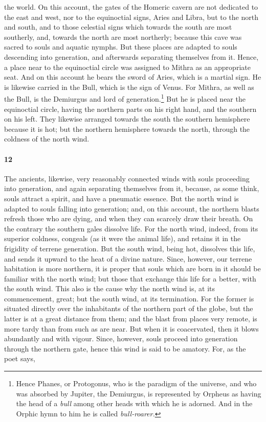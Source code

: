 \documentclass[a4paper,12pt]{article}
\begin{document}
the world. On this account, the gates of the Homeric cavern are not dedicated
to the east and west, nor to the equinoctial signs, Aries and Libra, but to the
north and south, and to those celestial signs which towards the south are most
southerly, and, towards the north are most northerly; because this cave was
sacred to souls and aquatic nymphs. But these places are adapted to souls
descending into generation, and afterwards separating themselves from it.
Hence, a place near to the equinoctial circle was assigned to Mithra as an
appropriate seat. And on this account he bears the sword of Aries, which is a
martial sign. He is likewise carried in the Bull, which is the sign of Venus.
For Mithra, as well as the Bull, is the Demiurgus and lord of
generation.\footnote{Hence Phanes, or Protogonus, who is the paradigm of the
universe, and who was absorbed by Jupiter, the Demiurgus, is represented by
Orpheus as having the head of a \textit{bull} among other heads with which he
is adorned. And in the Orphic hymn to him he is called \textit{bull-roarer.}}
But he is placed near the equinoctial circle, having the northern parts on his
right hand, and the southern on his left. They likewise arranged towards the
south the southern hemisphere because it is hot; but the northern hemisphere
towards the north, through the coldness of the north wind.


\paragraph{12} The ancients, likewise, very reasonably connected winds with
souls proceeding into generation, and again separating themselves from it,
because, as some think, souls attract a spirit, and have a pneumatic essence.
But the north wind is adapted to souls falling into generation; and, on this
account, the northern blasts refresh those who are dying, and when they can
scarcely draw their breath. On the contrary the southern gales dissolve life.
For the north wind, indeed, from its superior coldness, congeals (as it were
the animal life), and retains it in the frigidity of terrene generation. But
the south wind, being hot, dissolves this life, and sends it upward to the heat
of a divine nature. Since, however, our terrene habitation is more northern, it
is proper that souls which are born in it should be familiar with the north
wind; but those that exchange this life for a better, with the south wind. This
also is the cause why the north wind is, at its commencement, great; but the
south wind, at its termination. For the former is situated directly over the
inhabitants of the northern part of the globe, but the latter is at a great
distance from them; and the blast from places very remote, is more tardy than
from such as are near. But when it is coacervated, then it blows abundantly and
with vigour. Since, however, souls proceed into generation through the northern
gate, hence this wind is said to be amatory. For, as the poet says,
\end{document}
